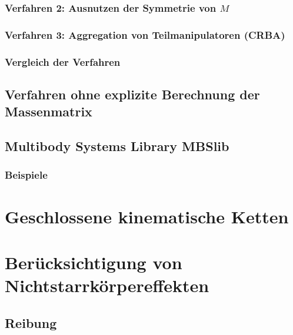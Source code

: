 \documentclass[a4paper, 11pt, accentcolor = tud3b]{tudreport}
\begin{document}
				\subsubsection{Verfahren 2: Ausnutzen der Symmetrie von \(M\)} %

				\subsubsection{Verfahren 3: Aggregation von Teilmanipulatoren (CRBA)} %

				\subsubsection{Vergleich der Verfahren} %

			\subsection{Verfahren ohne explizite Berechnung der Massenmatrix} %

			\subsection{Multibody Systems Library MBSlib} %

				\subsubsection{Beispiele} %

		\section{Geschlossene kinematische Ketten} %

		\section{Berücksichtigung von Nichtstarrkörpereffekten} %

			\subsection{Reibung} %
\end{document}

